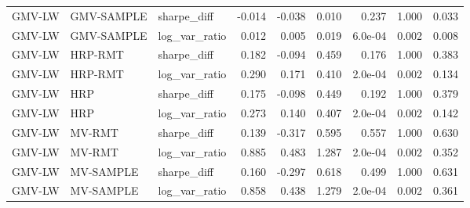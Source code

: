 \begin{table}[t]
{\begin{tabular}{lllrrrrrr}
GMV-LW & GMV-SAMPLE & sharpe\_diff & -0.014 & -0.038 & 0.010 & 0.237 & 1.000 & 0.033 \\
GMV-LW & GMV-SAMPLE & log\_var\_ratio & 0.012 & 0.005 & 0.019 & 6.0e-04 & 0.002 & 0.008 \\
GMV-LW & HRP-RMT & sharpe\_diff & 0.182 & -0.094 & 0.459 & 0.176 & 1.000 & 0.383 \\
GMV-LW & HRP-RMT & log\_var\_ratio & 0.290 & 0.171 & 0.410 & 2.0e-04 & 0.002 & 0.134 \\
GMV-LW & HRP & sharpe\_diff & 0.175 & -0.098 & 0.449 & 0.192 & 1.000 & 0.379 \\
GMV-LW & HRP & log\_var\_ratio & 0.273 & 0.140 & 0.407 & 2.0e-04 & 0.002 & 0.142 \\
GMV-LW & MV-RMT & sharpe\_diff & 0.139 & -0.317 & 0.595 & 0.557 & 1.000 & 0.630 \\
GMV-LW & MV-RMT & log\_var\_ratio & 0.885 & 0.483 & 1.287 & 2.0e-04 & 0.002 & 0.352 \\
GMV-LW & MV-SAMPLE & sharpe\_diff & 0.160 & -0.297 & 0.618 & 0.499 & 1.000 & 0.631 \\
GMV-LW & MV-SAMPLE & log\_var\_ratio & 0.858 & 0.438 & 1.279 & 2.0e-04 & 0.002 & 0.361 \\
\bottomrule
\end{tabular}}
\end{table}
